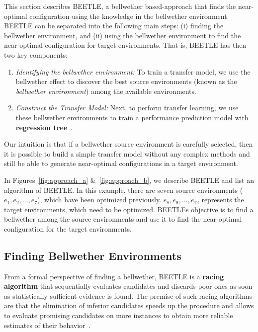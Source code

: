 \documentclass[10pt,journal,compsoc]{IEEEtran}
\newcommand{\be}{\begin{enumerate}}
\newcommand{\ee}{\end{enumerate}}
\begin{document}
This section describes BEETLE, a bellwether based-approach that finds the near-optimal configuration using the knowledge in the bellwether environment. BEETLE can be separated into the following main steps: (i) finding the bellwether environment, and (ii) using the bellwether environment to find the near-optimal configuration for target environments. That is, BEETLE has then two key components:
\be
    \item \textit{Identifying the bellwether environment:} To train a transfer model, we use the bellwether effect to discover the best source environments (known as the \textit{bellwether environment}) among the available environments. 
    
    \item \textit{Construct the Transfer Model:} Next, to perform transfer learning, we use these bellwether environments to train a performance prediction model with \textbf{regression tree}~\cite{breiman1996bagging}.
\ee

Our intuition is that if a bellwether source environment is carefully selected, then it is possible to build a simple transfer model without any complex methods and still be able to generate near-optimal configurations in a target environment. 

In Figures~\ref{fig:approach_a} \&~\ref{fig:approach_b}, we describe BEETLE and list an algorithm of BEETLE. In this example, there are seven source environments ($e_1, e_2,..., e_7$), which have been optimized previously. $e_8, e_9,..., e_{12}$ represents the target environments, which need to be optimized. BEETLE\textquotesingle s objective is to find a bellwether among the source environments and use it to find the near-optimal configuration for the target environments. 

\subsection{Finding Bellwether Environments}\label{subsec:finding}

From a formal perspective of finding a bellwether, BEETLE     is a  {\bf racing algorithm} that sequentially evaluates candidates and discards poor ones as soon as statistically sufficient evidence is found. The premise of such racing
algorithms are that the elimination of inferior candidates speeds up the procedure and allows to evaluate promising candidates on more instances to obtain more reliable estimates of their behavior~\cite{birattari2002racing}.
\end{document}
